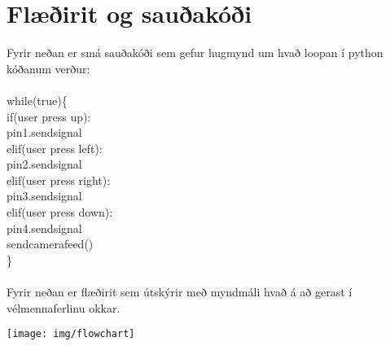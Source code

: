 \section{Flæðirit og sauðakóði}Fyrir neðan er smá sauðakóði sem gefur hugmynd um hvað loopan í python kóðanum verður:\\\\
while(true)\{\\
  if(user press up):\\
  	pin1.sendsignal\\
  elif(user press left):\\
  	pin2.sendsignal\\
  elif(user press right):\\
  	pin3.sendsignal\\
  elif(user press down):\\
  	pin4.sendsignal\\
  sendcamerafeed()\\
\}\\\\
Fyrir neðan er flæðirit sem útskýrir með myndmáli hvað á að gerast í vélmennaferlinu okkar.\\
\begin{center}
\texttt{[image: img/flowchart]}
\end{center}
